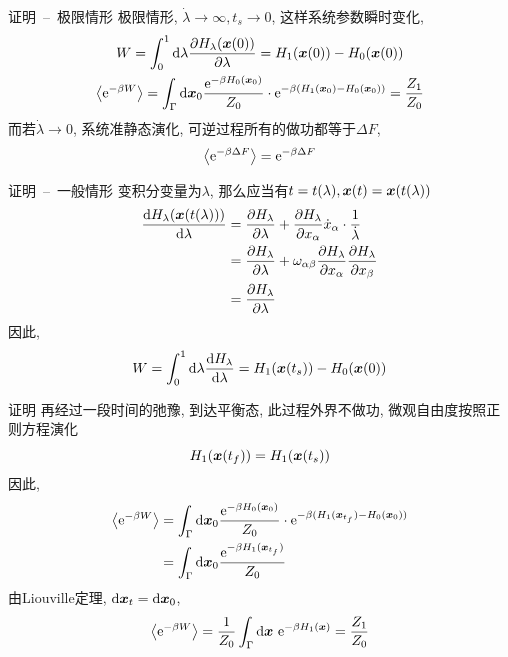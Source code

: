 \documentclass[aspectratio=169]{wzbeamer}
\begin{document}
    \begin{frame}{证明\ --\ 极限情形}
        极限情形, $\dot\lambda \to \infty, t_s\to 0$, 这样系统参数瞬时变化, 
        \begin{gather*}
            W = \int_0^1 \dd\lambda\pdv{H_\lambda(\vb*x(0))}{\lambda} = H_1(\vb*x(0)) - H_0(\vb*x(0)) \\
            \expval{\mathrm{e}^{-\beta W}} = \int_\Gamma\dd\vb*x_0 \dfrac{\mathrm{e}^{-\beta H_0(\vb*x_0)}}{Z_0} \cdot \mathrm{e}^{-\beta (H_1(\vb*x_0) - H_0(\vb*x_0))} = \frac{Z_1}{Z_0}
        \end{gather*}
        而若$\dot\lambda \to 0$, 系统准静态演化, 可逆过程所有的做功都等于$\Delta F$, 
        $$
        \expval{\mathrm{e}^{-\beta \Delta F}} = \mathrm{e}^{-\beta \Delta F}
        $$
    \end{frame}
    \begin{frame}{证明\ --\ 一般情形}
        变积分变量为$\lambda$, 那么应当有$t = t(\lambda), \vb*x(t) = \vb*x(t(\lambda))$
        \begin{equation}
            \begin{split}
                \dv{H_\lambda(\vb*x(t(\lambda)))}{\lambda} &= \pdv{H_\lambda}{\lambda} + \pdv{H_\lambda}{x_\alpha} \dot x_\alpha\cdot \frac1{\dot\lambda}\\
                &= \pdv{H_\lambda}{\lambda} + \omega_{\alpha\beta}\pdv{H_\lambda}{x_\alpha}\pdv{H_\lambda}{x_\beta}\\ 
                &= \pdv{H_\lambda}{\lambda}
            \end{split}
        \end{equation}
        因此,
        \begin{equation}
            W = \int_0^1 \dd \lambda \dv{H_\lambda}{\lambda} = H_1(\vb*x(t_s)) - H_0(\vb*x(0))
        \end{equation}
    \end{frame}
    \begin{frame}{证明}
        再经过一段时间的弛豫, 到达平衡态, 此过程外界不做功, 微观自由度按照正则方程演化
        $$H_1(\vb*x(t_f)) = H_1(\vb*x(t_s))$$
        因此,
        \begin{equation}
            \begin{split}
                \expval{\mathrm{e}^{-\beta W}} &= \int_\Gamma\dd\vb*x_0 \dfrac{\mathrm{e}^{-\beta H_0(\vb*x_0)}}{Z_0} \cdot \mathrm{e}^{-\beta (H_1(\vb*x_{t_f}) - H_0(\vb*x_0))}\\
                &= \int_\Gamma\dd\vb*x_0 \dfrac{\mathrm{e}^{-\beta H_1(\vb*x_{t_f})}}{Z_0}
            \end{split}
        \end{equation}
        由Liouville定理, $\dd\vb*x_t = \dd\vb*x_0$,
        \begin{equation}
            \expval{\mathrm{e}^{-\beta W}} = \frac1{Z_0} \int_\Gamma \dd\vb*x\ \mathrm{e}^{-\beta H_1(\vb*x)} = \frac{Z_1}{Z_0}
        \end{equation}
    \end{frame}
\end{document}
